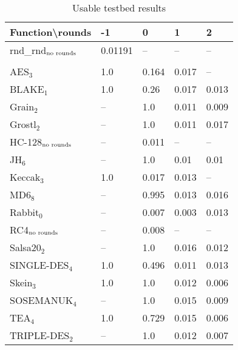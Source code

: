 \documentclass[twoside,a4paper]{article}
\begin{document}
\newcommand{\fd}{\cellcolor{red!13}}
\newcommand{\fn}{\cellcolor{green!13}}

\begin{table}[H]
\centering
\label{res_usable}
\begin{tabular}{l|l l l l}
Function\textbackslash{}rounds & -1 & 0 & 1 & 2\\ \hline
rnd\_rnd$_{\textnormal{no rounds}}$ & \fn{}0.01191 & --       & --         & --        \\\\
AES$_{3}$        & \fd{}1.0   & \fd{}0.164 & \fn{}0.017 & \fn{}--   \\
BLAKE$_{1}$      & \fd{}1.0   & \fd{}0.26  & \fn{}0.017 & \fn{}0.013\\
Grain$_{2}$      & \fd{}--    & \fd{}1.0   & \fn{}0.011 & \fn{}0.009\\
Grostl$_{2}$     & \fd{}--    & \fd{}1.0   & \fn{}0.011 & \fn{}0.017\\
HC-128$_{\textnormal{no rounds}}$& \fd{}--    & \fn{}0.011 & \fn{}--    & \fn{}--   \\
JH$_{6}$         & \fd{}--    & \fd{}1.0   & \fn{}0.01  & \fn{}0.01 \\
Keccak$_{3}$     & \fd{}1.0   & \fn{}0.017 & \fn{}0.013 & \fn{}--   \\
MD6$_{8}$        & \fd{}--    & \fd{}0.995 & \fn{}0.013 & \fn{}0.016\\
Rabbit$_{0}$     & \fd{}--    & \fn{}0.007 & \fn{}0.003 & \fn{}0.013\\
RC4$_{\textnormal{no rounds}}$& -- & \fn{}0.008 & --         & --        \\
Salsa20$_{2}$    & \fd{}--    & \fd{}1.0   & \fn{}0.016 & \fn{}0.012\\
SINGLE-DES$_{4}$ & \fd{}1.0   & \fd{}0.496 & \fn{}0.011 & \fn{}0.013\\
Skein$_{3}$      & \fd{}1.0   & \fd{}1.0   & \fn{}0.012 & \fn{}0.006\\
SOSEMANUK$_{4}$  & \fd{}--    & \fd{}1.0   & \fn{}0.015 & \fn{}0.009\\
TEA$_{4}$        & \fd{}1.0   & \fd{}0.729 & \fn{}0.015 & \fn{}0.006\\
TRIPLE-DES$_{2}$ & \fd{}--    & \fd{}1.0   & \fn{}0.012 & \fn{}0.007
\end{tabular}
\caption{Usable testbed results}
\end{table}
\end{document}
